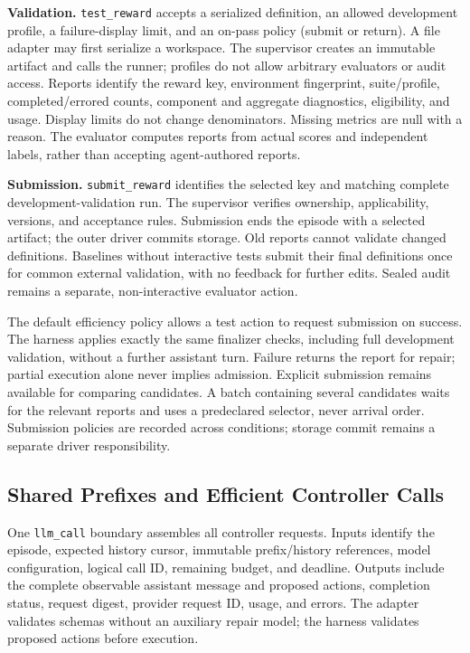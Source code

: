 \noindent\textbf{Validation.} \texttt{test\_reward} accepts a serialized definition, an allowed development profile, a failure-display limit, and an on-pass policy (submit or return). A file adapter may first serialize a workspace. The supervisor creates an immutable artifact and calls the runner; profiles do not allow arbitrary evaluators or audit access. Reports identify the reward key, environment fingerprint, suite/profile, completed/errored counts, component and aggregate diagnostics, eligibility, and usage. Display limits do not change denominators. Missing metrics are null with a reason. The evaluator computes reports from actual scores and independent labels, rather than accepting agent-authored reports.

\noindent\textbf{Submission.} \texttt{submit\_reward} identifies the selected key and matching complete development-validation run. The supervisor verifies ownership, applicability, versions, and acceptance rules. Submission ends the episode with a selected artifact; the outer driver commits storage. Old reports cannot validate changed definitions. Baselines without interactive tests submit their final definitions once for common external validation, with no feedback for further edits. Sealed audit remains a separate, non-interactive evaluator action.

The default efficiency policy allows a test action to request submission on success. The harness applies exactly the same finalizer checks, including full development validation, without a further assistant turn. Failure returns the report for repair; partial execution alone never implies admission. Explicit submission remains available for comparing candidates. A batch containing several candidates waits for the relevant reports and uses a predeclared selector, never arrival order. Submission policies are recorded across conditions; storage commit remains a separate driver responsibility.

\subsection{Shared Prefixes and Efficient Controller Calls}
\label{apd:llm_protocol}

One \texttt{llm\_call} boundary assembles all controller requests. Inputs identify the episode, expected history cursor, immutable prefix/history references, model configuration, logical call ID, remaining budget, and deadline. Outputs include the complete observable assistant message and proposed actions, completion status, request digest, provider request ID, usage, and errors. The adapter validates schemas without an auxiliary repair model; the harness validates proposed actions before execution.

